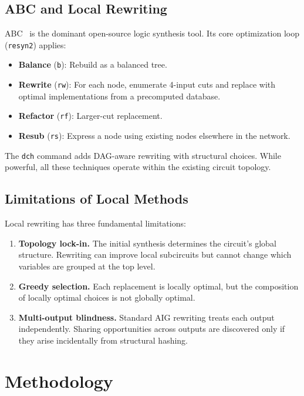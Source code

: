 \documentclass[conference,10pt]{IEEEtran}
\begin{document}
\subsection{ABC and Local Rewriting}

ABC~\cite{abc} is the dominant open-source logic synthesis tool. Its core optimization loop (\texttt{resyn2}) applies:

\begin{itemize}
    \item \textbf{Balance} (\texttt{b}): Rebuild as a balanced tree.
    \item \textbf{Rewrite} (\texttt{rw}): For each node, enumerate 4-input cuts and replace with optimal implementations from a precomputed database.
    \item \textbf{Refactor} (\texttt{rf}): Larger-cut replacement.
    \item \textbf{Resub} (\texttt{rs}): Express a node using existing nodes elsewhere in the network.
\end{itemize}

The \texttt{dch} command adds DAG-aware rewriting with structural choices. While powerful, all these techniques operate within the existing circuit topology.

\subsection{Limitations of Local Methods}

Local rewriting has three fundamental limitations:
\begin{enumerate}
    \item \textbf{Topology lock-in.} The initial synthesis determines the circuit's global structure. Rewriting can improve local subcircuits but cannot change which variables are grouped at the top level.
    \item \textbf{Greedy selection.} Each replacement is locally optimal, but the composition of locally optimal choices is not globally optimal.
    \item \textbf{Multi-output blindness.} Standard AIG rewriting treats each output independently. Sharing opportunities across outputs are discovered only if they arise incidentally from structural hashing.
\end{enumerate}

\section{Methodology}
\end{document}
